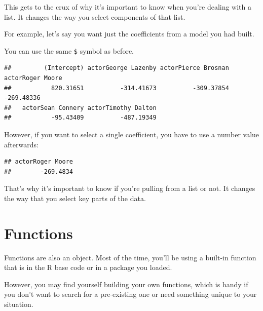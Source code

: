 \documentclass[
]{book}
\newenvironment{Shaded}{\begin{snugshade}}{\end{snugshade}}
\newcommand{\DecValTok}[1]{\textcolor[rgb]{0.00,0.00,0.81}{#1}}
\newcommand{\NormalTok}[1]{#1}
\newcommand{\OperatorTok}[1]{\textcolor[rgb]{0.81,0.36,0.00}{\textbf{#1}}}
\begin{document}
This gets to the crux of why it's important to know when you're dealing with a list. It changes the way you select components of that list.

For example, let's say you want just the coefficients from a model you had built.

You can use the same \texttt{\$} symbol as before.

\begin{Shaded}
\end{Shaded}

\begin{verbatim}
##         (Intercept) actorGeorge Lazenby actorPierce Brosnan    actorRoger Moore 
##           820.31651          -314.41673          -309.37854          -269.48336 
##   actorSean Connery actorTimothy Dalton 
##           -95.43409          -487.19349
\end{verbatim}

However, if you want to select a single coefficient, you have to use a number value afterwards:

\begin{Shaded}
\end{Shaded}

\begin{verbatim}
## actorRoger Moore 
##        -269.4834
\end{verbatim}

That's why it's important to know if you're pulling from a list or not. It changes the way that you select key parts of the data.

\hypertarget{functions}{%
\section{Functions}\label{functions}}

Functions are also an object. Most of the time, you'll be using a built-in function that is in the R base code or in a package you loaded.

However, you may find yourself building your own functions, which is handy if you don't want to search for a pre-existing one or need something unique to your situation.
\end{document}
